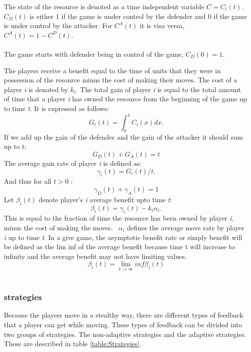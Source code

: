 The state of the resource is denoted as a time independent variable $C=C_{i}(t)$. 
$C_{D}(t)$ is either 1 if the game is under control by the defender and 0 if the game is under control by the attacker. For $C^{A}(t)$ it is visa versa, $C^{A}(t)= 1 - C^{D}(t)$.\\ \\
The game starts with defender being in control of the game, $C_{D}(0)= 1$. 

The players receive a benefit equal to the time of units that they were in possession of the resource minus the cost of making their moves. The cost of a player \textit{i} is denoted by $k_{i}$. 
The total gain of player \textit{i} is equal to the total amount of time that a player \textit{i} has owned the resource from the beginning of the game up to time \textit{t}. It is expressed as follows:
\begin{equation}\label{first}
G_{i}(t) = \int_0^1 \! C_{i}(x) dx.
\end{equation}
If we add up the gain of the defender and the gain of the attacker it should sum up to t:
\begin{equation}\label{first}
G_{D}(t) + G_{A}(t) = t
\end{equation}
The average gain rate of player \textit{i} is defined as:
\begin{equation}\label{first}
\gamma_{i}(t) = G_{i}(t)/t.
\end{equation}
And thus for all $t > 0$ :
\begin{equation}\label{first}
\gamma_{D}(t) + \gamma_{A}(t) = 1
\end{equation}
Let $\beta_{i}(t)$ denote player's \textit{i} average benefit upto time \textit{t}:
\begin{equation}\label{first}
\beta_{i}(t) = \gamma_{i}(t) - k_{i}\alpha_{i}.
\end{equation}
This is equal to the fraction of time the resource has been owned by player \textit{i}, minus the cost of making the moves. ~$ \alpha_{i}$ defines the average move rate by player \textit{i} up to time \textit{t}.
In a give game, the asymptotic benefit rate or simply benefit will be defined as the lim inf of the average benefit because time t will increase to infinity and the average benefit may not have limiting values.
\[ \beta_{i}(t)  = \lim_{t \to \infty} inf \beta_{i}(t)  \]
\\


\subsubsection{strategies}
Because the players move in a stealthy way, there are different types of feedback that a player can get while moving. These types of feedback can be divided into two groups of strategies. The non-adaptive strategies and the adaptive strategies. These are described in table \ref{table:Strategies}. \\

